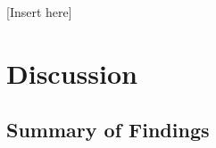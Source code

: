 \documentclass[mksc,blindrev]{informs3} %
\begin{document}
[Insert  here]







\section*{Discussion} \label{sec:discussion}

\subsection{Summary of Findings}
\end{document}

